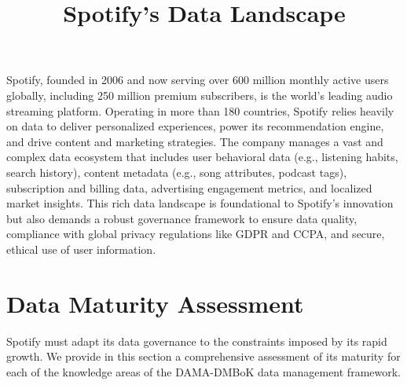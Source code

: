 \documentclass[11pt,a4paper,computermodern]{article}
\title{Spotify's Data Landscape}
\date{}
\begin{document}
\maketitle

\vspace{-10mm}

Spotify, founded in 2006 and now serving over 600 million monthly active users globally, including 250 million premium subscribers, is the world’s leading audio streaming platform. Operating in more than 180 countries, Spotify relies heavily on data to deliver personalized experiences, power its recommendation engine, and drive content and marketing strategies. The company manages a vast and complex data ecosystem that includes user behavioral data (e.g., listening habits, search history), content metadata (e.g., song attributes, podcast tags), subscription and billing data, advertising engagement metrics, and localized market insights. This rich data landscape is foundational to Spotify’s innovation but also demands a robust governance framework to ensure data quality, compliance with global privacy regulations like GDPR and CCPA, and secure, ethical use of user information.


\section*{Data Maturity Assessment}

Spotify must adapt its data governance to the constraints imposed by its rapid growth. We provide in this section a comprehensive assessment of its maturity for each of the knowledge areas of the DAMA-DMBoK data management framework.
\end{document}
